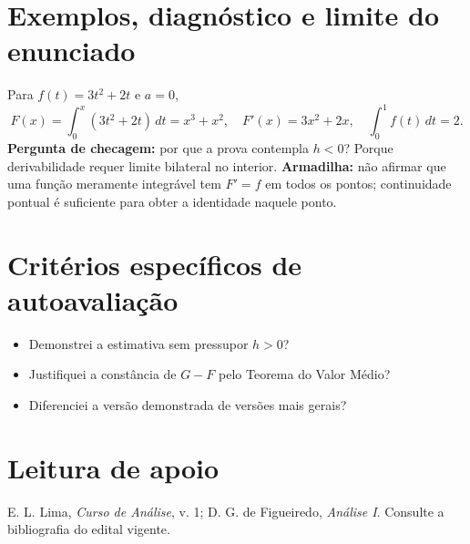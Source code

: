 \documentclass[11pt,a4paper]{article}
\begin{document}
\section{Exemplos, diagnóstico e limite do enunciado}
Para $f(t)=3t^2+2t$ e $a=0$,
\[
F(x)=\int_0^x(3t^2+2t)\,dt=x^3+x^2,\quad
F'(x)=3x^2+2x,\quad \int_0^1 f(t)\,dt=2.
\]
\textbf{Pergunta de checagem:} por que a prova contempla $h<0$? Porque derivabilidade requer limite bilateral no interior. \textbf{Armadilha:} não afirmar que uma função meramente integrável tem $F'=f$ em todos os pontos; continuidade pontual é suficiente para obter a identidade naquele ponto.
\section{Critérios específicos de autoavaliação}
\begin{itemize}
\item Demonstrei a estimativa sem pressupor $h>0$?
\item Justifiquei a constância de $G-F$ pelo Teorema do Valor Médio?
\item Diferenciei a versão demonstrada de versões mais gerais?
\end{itemize}
\RubricaUFMT
\section{Leitura de apoio}
E. L. Lima, \emph{Curso de Análise}, v. 1; D. G. de Figueiredo, \emph{Análise I}. Consulte a bibliografia do edital vigente.
\end{document}
